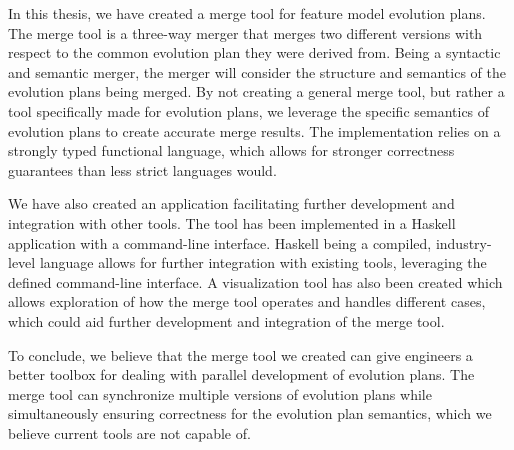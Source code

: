 \documentclass[a4paper,english]{ifimaster}
\begin{document}
In this thesis, we have created a merge tool for feature model evolution plans. The merge tool is a three-way merger that merges two different versions with respect to the common evolution plan they were derived from. Being a syntactic and semantic merger, the merger will consider the structure and semantics of the evolution plans being merged. By not creating a general merge tool, but rather a tool specifically made for evolution plans, we leverage the specific semantics of evolution plans to create accurate merge results. The implementation relies on a strongly typed functional language, which allows for stronger correctness guarantees than less strict languages would.

We have also created an application facilitating further development and integration with other tools. The tool has been implemented in a Haskell application with a command-line interface. Haskell being a compiled, industry-level language allows for further integration with existing tools, leveraging the defined command-line interface. A visualization tool has also been created which allows exploration of how the merge tool operates and handles different cases, which could aid further development and integration of the merge tool.

To conclude, we believe that the merge tool we created can give engineers a better toolbox for dealing with parallel development of evolution plans. The merge tool can synchronize multiple versions of evolution plans while simultaneously ensuring correctness for the evolution plan semantics, which we believe current tools are not capable of.

\backmatter{}

\printbibliography
\end{document}
